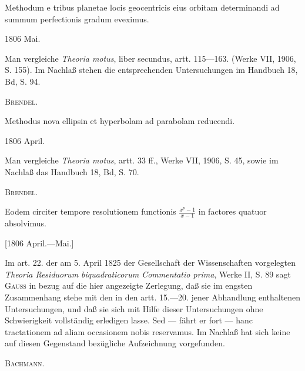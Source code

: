 \noindent\hspace*{\parindent}Methodum e tribus planetae locis geocentricis eius orbitam determinandi ad summum perfectionis gradum eveximus.
\par\noindent\hfill 1806 Mai.
\clearpage{}
\par\begingroup\small
\noindent\hspace*{\parindent}Man vergleiche \textit{Theoria motus}, liber secundus, artt. 115—163. (Werke VII, 1906, S. 155). Im Nachlaß stehen die entsprechenden Untersuchungen im Handbuch 18, Bd, S. 94.
\par\noindent\hfill\textsc{Brendel.}
\par\endgroup

\noindent\hspace*{\parindent}Methodus nova ellipsin et hyperbolam ad parabolam reducendi.
\par\noindent\hfill 1806 April.
\par\medskip\begingroup\small
\noindent\hspace*{\parindent}Man vergleiche \textit{Theoria motus}, artt. 33 ff., Werke VII, 1906, S. 45, sowie im Nachlaß das Handbuch 18, Bd, S. 70.
\par\noindent\hfill\textsc{Brendel.}
\par\endgroup

\noindent\hspace*{\parindent}Eodem circiter tempore resolutionem functionis \(\frac{x^p-1}{x-1}\) in factores quatuor absolvimus.
\par\noindent\hfill [1806 April.—Mai.]
\par\medskip\begingroup\small
\noindent\hspace*{\parindent}Im art. 22. der am 5. April 1825 der Gesellschaft der Wissenschaften vorgelegten \textit{Theoria Residuorum biquadraticorum Commentatio prima}, Werke II, S. 89 sagt \textsc{Gauss} in bezug auf die hier angezeigte Zerlegung, daß sie im engsten Zusammenhang stehe mit den in den artt. 15.—20. jener Abhandlung enthaltenen Untersuchungen, und daß sie sich mit Hilfe dieser Untersuchungen ohne Schwierigkeit vollständig erledigen lasse. Sed — fährt er fort — hanc tractationem ad aliam occasionem nobis reservamus. Im Nachlaß hat sich keine auf diesen Gegenstand bezügliche Aufzeichnung vorgefunden.
\par\noindent\hfill\textsc{Bachmann.}
\par\endgroup

